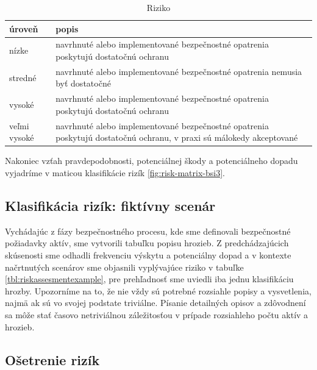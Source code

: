 \begin{table}[!h]
    \caption{Riziko}
    \label{tab:thrimp}
    \begin{center}
        \footnotesize
        \begin{tabularx}{\textwidth}{|X|X|}
        \hline
        úroveň & popis \\
        \hline
        \hline
        nízke & navrhnuté alebo implementované bezpečnostné opatrenia poskytujú dostatočnú ochranu \\
        \hline
        stredné & navrhnuté alebo implementované bezpečnostné opatrenia nemusia byť dostatočné \\
        \hline
        vysoké & navrhnuté alebo implementované bezpečnostné opatrenia poskytujú dostatočnú ochranu \\
        \hline
        veľmi vysoké & navrhnuté alebo implementované bezpečnostné opatrenia poskytujú dostatočnú ochranu, v praxi sú málokedy akceptované \\
        \hline
        \end{tabularx}
    \end{center}
\end{table}

Nakoniec vzťah pravdepodobnosti, potenciálnej škody a potenciálneho dopadu vyjadríme v maticou klasifikácie rizík \ref{fig:risk-matrix-bsi3}.


\subsection*{Klasifikácia rizík: fiktívny scenár}
Vychádajúc z fázy bezpečnostného procesu, kde sme definovali bezpečnostné požiadavky aktív, sme vytvorili tabuľku popisu hrozieb. Z predchádzajúcich
skúsenosti sme odhadli frekvenciu výskytu a potenciálny dopad a v kontexte načrtnutých scenárov sme objasnili vyplývajúce riziko v tabuľke
\ref{tbl:riskassesmentexample}, pre prehľadnosť sme uviedli iba jednu klasifikáciu hrozby. Upozorníme na to, že nie vždy sú potrebné rozsiahle popisy
a vysvetlenia, najmä ak sú vo svojej podstate triviálne. Písanie detailných opisov a zdôvodnení sa môže stať časovo netriviálnou záležitosťou v prípade
rozsiahleho počtu aktív a hrozieb.


\newpage

\subsection{Ošetrenie rizík}

